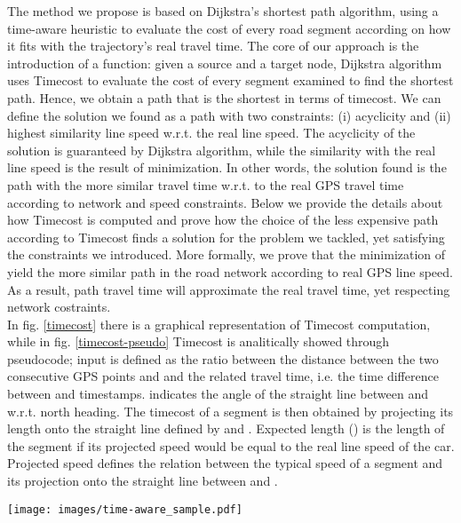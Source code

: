 \documentclass[5p]{elsarticle}
\begin{document}
The method we propose is based on Dijkstra's shortest path algorithm, using a time-aware heuristic to evaluate the cost of every road segment according on how it fits with the trajectory's real travel time.
The core of our approach is the introduction of a  function: given a source and a target node, Dijkstra algorithm uses Timecost to evaluate the cost of every segment 
examined to find the shortest path. 
Hence, we obtain a path that is the shortest in terms of timecost. We can define the solution we found as a path with two constraints: (i) acyclicity and (ii) highest similarity
line speed w.r.t. the real line speed. The acyclicity of the solution is guaranteed by Dijkstra algorithm, while the similarity with the real line speed is the result of  minimization. In other words, the solution found is the
path with the more similar travel time w.r.t. to the real GPS travel time according to network and speed constraints.
Below we provide the details about how Timecost is computed and prove how the choice of the less expensive path according to Timecost finds a solution for the problem we tackled,
yet satisfying the constraints we introduced. More formally, we prove that the minimization of
 yield the more similar path in the road network according to real GPS line speed. As a result, path travel time will approximate the real travel time, yet 
respecting network costraints. \\
In fig. \ref{timecost} there is a graphical representation of Timecost computation, while in fig. \ref{timecost-pseudo} Timecost is analitically showed through pseudocode; input  is defined as the ratio between 
the distance between the two consecutive GPS points  and  and the related travel time, i.e. the time difference between  and  timestamps.  indicates the angle of the straight line between  and  w.r.t. north heading.
The timecost of a segment is then obtained by projecting its length onto the straight line defined by  and .
Expected length () is the length of the segment if its projected speed would be equal to the real
line speed of the car.
Projected speed defines the relation between the typical speed of a segment and its projection onto the straight line between  and . 


\begin{figure*}[t!]

\centering
\texttt{[image: images/time-aware\_sample.pdf]}
\caption{The computation of timecost for segment : the length of segment is projected onto the straight line trajectory between GPS points  and , 
then the timecost is computed as the difference between the length and the supposed length of the segment, according to the straight line speed of the car.}
\label{timecost}
\end{figure*}
\end{document}
